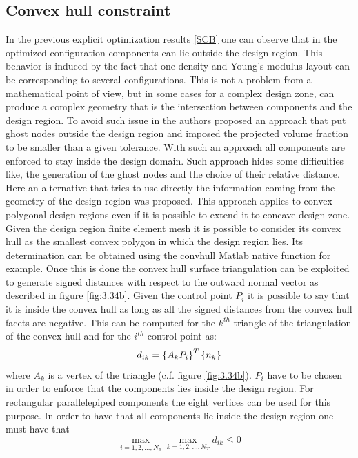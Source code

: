  \subsection{Convex hull constraint}
  \label{ss3.10.2}
  In the previous explicit optimization results \ref{SCB} one can observe that in the optimized configuration components can lie outside the design region. This behavior is induced by the fact that one density and Young's modulus layout can be corresponding to several configurations. This is not a problem from a mathematical point of view, but in some cases for a complex design zone, can produce a complex geometry that is the intersection between components and the design region. To avoid such issue in \cite{zhang2018geometry} the authors proposed an approach that put ghost nodes outside the design region and imposed the projected volume fraction to be smaller than a given tolerance. With such an approach all components are enforced to stay inside the design domain. Such approach hides some difficulties like, the generation of the ghost nodes and the choice of their relative distance. Here an alternative that tries to use directly the information coming from the geometry of the design region was proposed. This approach applies to convex polygonal design regions even if it is possible to extend it to concave design zone. Given the design region finite element mesh it is possible to consider its convex hull as the smallest convex polygon in which the design region lies. Its determination can be obtained using the convhull Matlab native function for example. Once this is done the convex hull surface triangulation can be exploited to generate signed distances with respect to the outward normal vector as described in figure \ref{fig:3.34b}. Given the control point $P_i$ it is possible to say that it is inside the convex hull as long as all the signed distances from the convex hull facets are negative. This can be computed for the $k^{th}$ triangle of the triangulation of the convex hull and for the $i^{th}$ control point as:
  \begin{equation}
  d_{ik}=\left\lbrace{A_kP_i}\right \rbrace^T\left\lbrace{n_k}\right \rbrace
  \end{equation}
  where $A_k$ is a vertex of the triangle (c.f. figure \ref{fig:3.34b}). $P_i$ have to be chosen in order to enforce that the components lies inside the design region. For rectangular parallelepiped components the eight vertices can be used for this purpose. In order to have that all components lie inside the design region one must have that 
  \begin{equation}
    \max_{i=1,2,...,N_p} {\max_{k=1,2,...,N_T}{d_{ik}}}\leq 0
  \end{equation}
